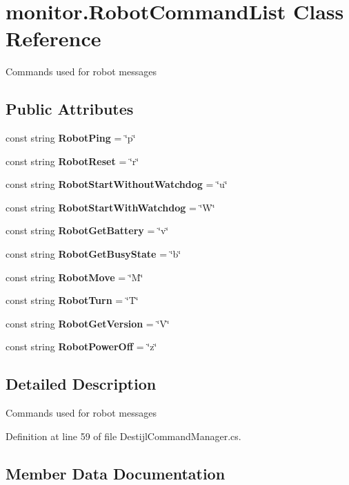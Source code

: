 \section{monitor.\+Robot\+Command\+List Class Reference}
\label{classmonitor_1_1_robot_command_list}


Commands used for robot messages  


\subsection*{Public Attributes}
\begin{DoxyCompactItemize}
\item 
const string \textbf{ Robot\+Ping} = \char`\"{}p\char`\"{}
\item 
const string \textbf{ Robot\+Reset} = \char`\"{}r\char`\"{}
\item 
const string \textbf{ Robot\+Start\+Without\+Watchdog} = \char`\"{}u\char`\"{}
\item 
const string \textbf{ Robot\+Start\+With\+Watchdog} = \char`\"{}W\char`\"{}
\item 
const string \textbf{ Robot\+Get\+Battery} = \char`\"{}v\char`\"{}
\item 
const string \textbf{ Robot\+Get\+Busy\+State} = \char`\"{}b\char`\"{}
\item 
const string \textbf{ Robot\+Move} = \char`\"{}M\char`\"{}
\item 
const string \textbf{ Robot\+Turn} = \char`\"{}T\char`\"{}
\item 
const string \textbf{ Robot\+Get\+Version} = \char`\"{}V\char`\"{}
\item 
const string \textbf{ Robot\+Power\+Off} = \char`\"{}z\char`\"{}
\end{DoxyCompactItemize}


\subsection{Detailed Description}
Commands used for robot messages 



Definition at line 59 of file Destijl\+Command\+Manager.\+cs.



\subsection{Member Data Documentation}
\mbox{\label{classmonitor_1_1_robot_command_list_a374eb526d14b8499e47b065230afeed0}} 
